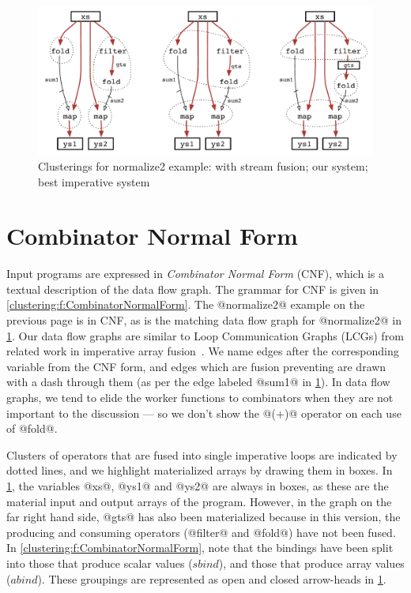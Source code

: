 
\begin{figure}[ht!]
\begin{center}
\includegraphics[scale=0.5]{copy/03-body/clustering/figures/ex1-compare.pdf}
\end{center}
\caption{Clusterings for normalize2 example: with stream fusion; our system; best imperative system}
\label{clustering:f:normalize2-clusterings}
\end{figure}


\section{Combinator Normal Form}
\label{clustering:s:CombinatorNormalForm}
Input programs are expressed in \emph{Combinator Normal Form} (CNF), which is a textual description of the data flow graph. The grammar for CNF is given in \cref{clustering:f:CombinatorNormalForm}. The @normalize2@  example on the previous page is in CNF,  as is the matching data flow graph for @normalize2@ in \cref{clustering:f:normalize2-clusterings}. Our data flow graphs are similar to Loop Communication Graphs (LCGs) from related work in imperative array fusion~\cite{gao1993collective}. We name edges after the corresponding variable from the CNF form, and edges which are fusion preventing are drawn with a dash through them (as per the edge labeled @sum1@ in \cref{clustering:f:normalize2-clusterings}). In data flow graphs, we tend to elide the worker functions to combinators when they are not important to the discussion --- so we don't show the @(+)@ operator on each use of @fold@.

Clusters of operators that are fused into single imperative loops are indicated by dotted lines, and we highlight materialized arrays by drawing them in boxes. In \cref{clustering:f:normalize2-clusterings}, the variables @xs@, @ys1@ and @ys2@ are always in boxes, as these are the material input and output arrays of the program. However, in the graph on the far right hand side, @gts@ has also been materialized because in this version, the producing and consuming operators (@filter@ and @fold@) have not been fused. In \cref{clustering:f:CombinatorNormalForm}, note that the bindings have been split into those that produce scalar values ($sbind$), and those that produce array values ($abind$). These groupings are represented as open and closed arrow-heads in \cref{clustering:f:normalize2-clusterings}.

